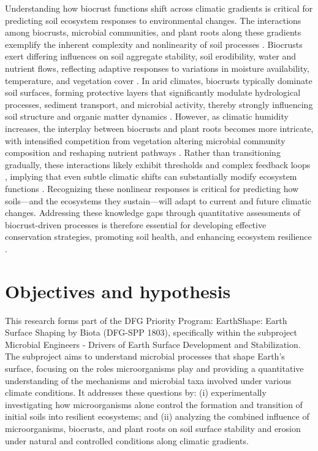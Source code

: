 Understanding how biocrust functions shift across climatic gradients is critical for predicting soil ecosystem responses to environmental changes. The interactions among biocrusts, microbial communities, and plant roots along these gradients exemplify the inherent complexity and nonlinearity of soil processes \citep{Wang2014}. Biocrusts exert differing influences on soil aggregate stability, soil erodibility, water and nutrient flows, reflecting adaptive responses to variations in moisture availability, temperature, and vegetation cover \citep{Belnap2003,Weber2022}. In arid climates, biocrusts typically dominate soil surfaces, forming protective layers that significantly modulate hydrological processes, sediment transport, and microbial activity, thereby strongly influencing soil structure and organic matter dynamics \citep{Kidron2021,RodriguezCaballero2018}. However, as climatic humidity increases, the interplay between biocrusts and plant roots becomes more intricate, with intensified competition from vegetation altering microbial community composition and reshaping nutrient pathways \citep{RiverasMuñoz2022,Seitz2017}. Rather than transitioning gradually, these interactions likely exhibit thresholds and complex feedback loops \cite{Wang2014}, implying that even subtle climatic shifts can substantially modify ecosystem functions \citep{Bernhard2018}. Recognizing these nonlinear responses is critical for predicting how soils—and the ecosystems they sustain—will adapt to current and future climatic changes. Addressing these knowledge gaps through quantitative assessments of biocrust-driven processes is therefore essential for developing effective conservation strategies, promoting soil health, and enhancing ecosystem resilience \citep{BelnapBüdel2016,Weber2022}.

\section{Objectives and hypothesis}
\label{sec:ObjectivesHypothesis}

This research forms part of the DFG Priority Program: EarthShape: Earth Surface Shaping by Biota (DFG-SPP 1803), specifically within the subproject Microbial Engineers - Drivers of Earth Surface Development and Stabilization. The subproject aims to understand microbial processes that shape Earth's surface, focusing on the roles microorganisms play and providing a quantitative understanding of the mechanisms and microbial taxa involved under various climate conditions. It addresses these questions by: (i) experimentally investigating how microorganisms alone control the formation and transition of initial soils into resilient ecosystems; and (ii) analyzing the combined influence of microorganisms, biocrusts, and plant roots on soil surface stability and erosion under natural and controlled conditions along climatic gradients.

